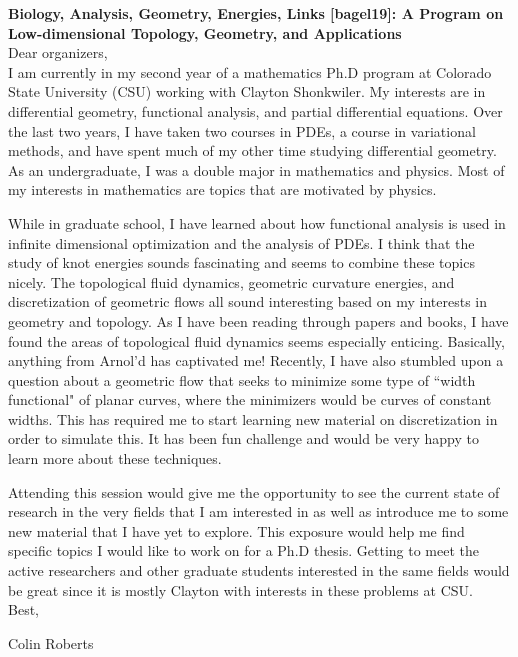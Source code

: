 \documentclass{article}
\begin{document}


\noindent \textbf{Biology, Analysis, Geometry, Energies, Links [bagel19]: A Program on Low-dimensional Topology, Geometry, and Applications}\\

\noindent Dear organizers,\\

I am currently in my second year of a mathematics Ph.D program at Colorado State University (CSU) working with Clayton Shonkwiler. My interests are in differential geometry, functional analysis, and partial differential equations.  Over the last two years, I have taken two courses in PDEs, a course in variational methods, and have spent much of my other time studying differential geometry.  As an undergraduate, I was a double major in mathematics and physics.  Most of my interests in mathematics are topics that are motivated by physics.

While in graduate school, I have learned about how functional analysis is used in infinite dimensional optimization and the analysis of PDEs.  I think that the study of knot energies sounds fascinating and seems to combine these topics nicely.  The topological fluid dynamics, geometric curvature energies, and discretization of geometric flows all sound interesting based on my interests in geometry and topology.  As I have been reading through papers and books, I have found the areas of topological fluid dynamics seems especially enticing. Basically, anything from Arnol'd has captivated me! Recently, I have also stumbled upon a question about a geometric flow that seeks to minimize some type of ``width functional" of planar curves, where the minimizers would be curves of constant widths.  This has required me to start learning new material on discretization in order to simulate this. It has been fun challenge and would be very happy to learn more about these techniques.


Attending this session would give me the opportunity to see the current state of research in the very fields that I am interested in as well as introduce me to some new material that I have yet to explore.  This exposure would help me find specific topics I would like to work on for a Ph.D thesis.  Getting to meet the active researchers and other graduate students interested in the same fields would be great since it is mostly Clayton with interests in these problems at CSU.\\


\noindent Best,

\noindent Colin Roberts
\end{document}
